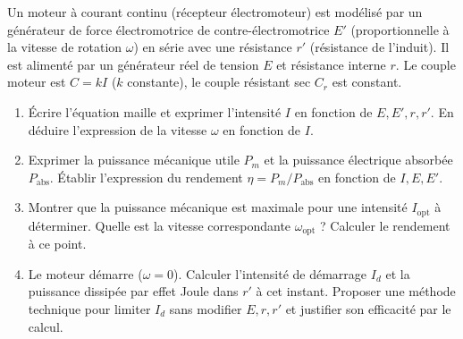 \documentclass[11pt]{article}
\begin{document}
\begin{exercice}
Un moteur à courant continu (récepteur électromoteur) est modélisé par un générateur de force électromotrice de contre-électromotrice $E'$ (proportionnelle à la vitesse de rotation $\omega$) en série avec une résistance $r'$ (résistance de l'induit). Il est alimenté par un générateur réel de tension $E$ et résistance interne $r$. Le couple moteur est $C = k I$ ($k$ constante), le couple résistant sec $C_r$ est constant.
\begin{enumerate}
    \item Écrire l'équation maille et exprimer l'intensité $I$ en fonction de $E, E', r, r'$. En déduire l'expression de la vitesse $\omega$ en fonction de $I$.
    \item Exprimer la puissance mécanique utile $P_m$ et la puissance électrique absorbée $P_{\text{abs}}$. Établir l'expression du rendement $\eta = P_m / P_{\text{abs}}$ en fonction de $I, E, E'$.
    \item Montrer que la puissance mécanique est maximale pour une intensité $I_{\text{opt}}$ à déterminer. Quelle est la vitesse correspondante $\omega_{\text{opt}}$ ? Calculer le rendement à ce point.
    \item Le moteur démarre ($\omega=0$). Calculer l'intensité de démarrage $I_d$ et la puissance dissipée par effet Joule dans $r'$ à cet instant. Proposer une méthode technique pour limiter $I_d$ sans modifier $E, r, r'$ et justifier son efficacité par le calcul.
\end{enumerate}
\end{exercice}
\end{document}
